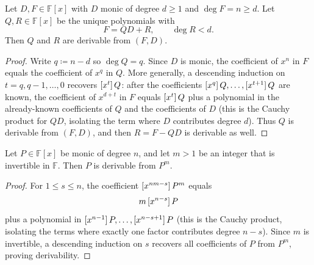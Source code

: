 \begin{lemma}\label{lem:monic-division}
    Let $D,F\in\mathbb{F}[x]$ with $D$ monic of degree $d\ge 1$ and $\deg F=n\ge d$.
    Let $Q,R\in\mathbb{F}[x]$ be the unique polynomials with
    \[
      F=QD+R,\qquad \deg R<d.
    \]
    Then $Q$ and $R$ are derivable from $(F,D)$.
\end{lemma}
\begin{proof}
    Write $q\coloneqq n-d$ so $\deg Q=q$.
    Since $D$ is monic, the coefficient of $x^{n}$ in $F$ equals the coefficient of $x^{q}$ in $Q$.
    More generally, a descending induction on $t=q,q-1,\ldots,0$ recovers $\coeff{Q}{t}$:
    after the coefficients $\coeff{Q}{q},\ldots,\coeff{Q}{t+1}$ are known, the coefficient of $x^{d+t}$ in $F$
    equals $\coeff{Q}{t}$ plus a polynomial in the already-known coefficients of $Q$ and the coefficients of $D$
    (this is the Cauchy product for $QD$, isolating the term where $D$ contributes degree $d$).
    Thus $Q$ is derivable from $(F,D)$, and then $R=F-QD$ is derivable as well.
\end{proof}

\begin{lemma}\label{lem:monic-from-power}
    Let $P\in\mathbb{F}[x]$ be monic of degree $n$, and let $m>1$ be an integer that is invertible in $\mathbb{F}$.
    Then $P$ is derivable from $P^m$.
\end{lemma}
\begin{proof}
    For $1\le s\le n$, the coefficient $\coeff{P^m}{nm-s}$ equals
    \[
        m\,\coeff{P}{n-s}
    \]
    plus a polynomial in $\coeff{P}{n-1},\ldots,\coeff{P}{n-s+1}$ (this is the Cauchy product, isolating the terms where exactly one factor contributes degree $n-s$).
    Since $m$ is invertible, a descending induction on $s$ recovers all coefficients of $P$ from $P^m$, proving derivability.
\end{proof}

